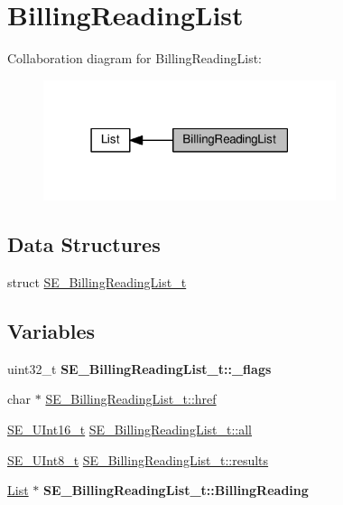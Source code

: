 \hypertarget{group__BillingReadingList}{}\section{Billing\+Reading\+List}
\label{group__BillingReadingList}
Collaboration diagram for Billing\+Reading\+List\+:\nopagebreak
\begin{figure}[H]
\begin{center}
\leavevmode
\includegraphics[width=243pt]{group__BillingReadingList}
\end{center}
\end{figure}
\subsection*{Data Structures}
\begin{DoxyCompactItemize}
\item 
struct \hyperlink{structSE__BillingReadingList__t}{S\+E\+\_\+\+Billing\+Reading\+List\+\_\+t}
\end{DoxyCompactItemize}
\subsection*{Variables}
\begin{DoxyCompactItemize}
\item 
\mbox{\label{group__BillingReadingList_ga2df19ce480a82e20e1523c342e1c0faa}} 
uint32\+\_\+t {\bfseries S\+E\+\_\+\+Billing\+Reading\+List\+\_\+t\+::\+\_\+flags}
\item 
char $\ast$ \hyperlink{group__BillingReadingList_gaebc6ad48b2507e612e497bea80757f34}{S\+E\+\_\+\+Billing\+Reading\+List\+\_\+t\+::href}
\item 
\hyperlink{group__UInt16_gac68d541f189538bfd30cfaa712d20d29}{S\+E\+\_\+\+U\+Int16\+\_\+t} \hyperlink{group__BillingReadingList_ga1dcc0d443c7bbbb96df9bf7af537ce2a}{S\+E\+\_\+\+Billing\+Reading\+List\+\_\+t\+::all}
\item 
\hyperlink{group__UInt8_gaf7c365a1acfe204e3a67c16ed44572f5}{S\+E\+\_\+\+U\+Int8\+\_\+t} \hyperlink{group__BillingReadingList_gad0f564641791feb12946e5bc2f729f1b}{S\+E\+\_\+\+Billing\+Reading\+List\+\_\+t\+::results}
\item 
\mbox{\label{group__BillingReadingList_ga6a2bd4b93f140c6881f716e5659a4e74}} 
\hyperlink{structList}{List} $\ast$ {\bfseries S\+E\+\_\+\+Billing\+Reading\+List\+\_\+t\+::\+Billing\+Reading}
\end{DoxyCompactItemize}


